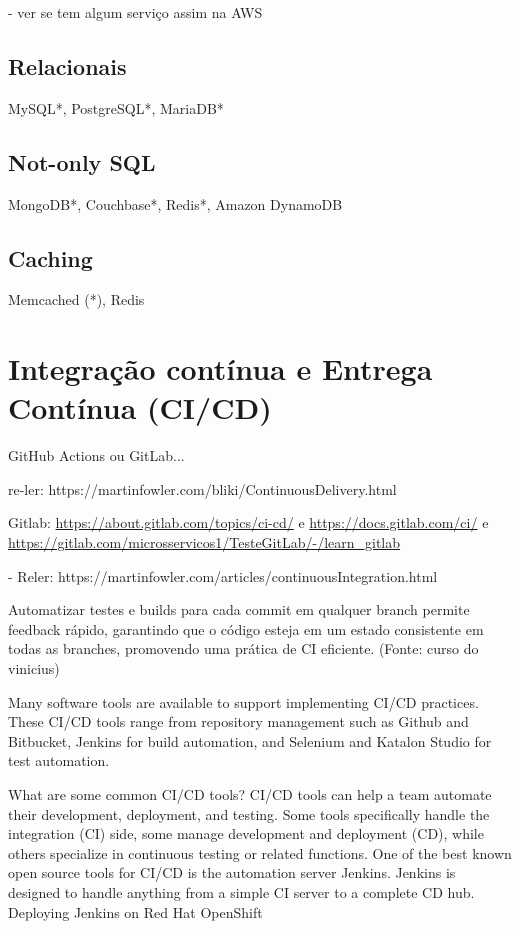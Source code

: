 - ver se tem algum serviço assim na AWS

\subsection{Relacionais}
MySQL*, PostgreSQL*, MariaDB*

\subsection{Not-only SQL}
MongoDB*, Couchbase*, Redis*, Amazon DynamoDB

\subsection{Caching}
Memcached (*), Redis

\section{Integração contínua e Entrega Contínua (CI/CD)}

GitHub Actions ou GitLab... 

re-ler: https://martinfowler.com/bliki/ContinuousDelivery.html

Gitlab: \url{https://about.gitlab.com/topics/ci-cd/} e \url{https://docs.gitlab.com/ci/} e \url{https://gitlab.com/microsservicos1/TesteGitLab/-/learn_gitlab}

- Reler: https://martinfowler.com/articles/continuousIntegration.html

Automatizar testes e builds para cada commit em qualquer branch permite feedback rápido, garantindo que o código esteja em um estado consistente em todas as branches, promovendo uma prática de CI eficiente. (Fonte: curso do vinicius)

Many software tools are available to support implementing CI/CD practices. These CI/CD tools range from repository management such as Github and Bitbucket, Jenkins for build automation, and Selenium and Katalon Studio for test automation.

What are some common CI/CD tools?
CI/CD tools can help a team automate their development, deployment, and testing. Some tools specifically handle the integration (CI) side, some manage development and deployment (CD), while others specialize in continuous testing or related functions.
One of the best known open source tools for CI/CD is the automation server Jenkins. Jenkins is designed to handle anything from a simple CI server to a complete CD hub.
Deploying Jenkins on Red Hat OpenShift

